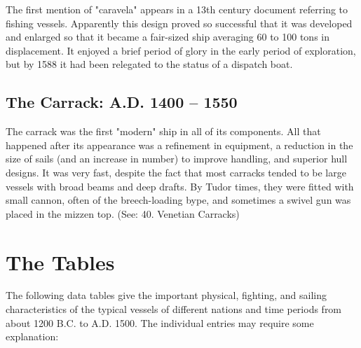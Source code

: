 \documentclass{article}
\begin{document}
\begin{multicols}{3}
The first mention of "caravela" appears in a 13th century document
referring to fishing vessels.  Apparently this design proved so
successful that it was developed and enlarged so that it became a
fair-sized ship averaging 60 to 100 tons in displacement.  It enjoyed
a brief period of glory in the early period of exploration, but by
1588 it had been relegated to the status of a dispatch boat.

\subsection{The Carrack:  A.D. 1400 -- 1550}

The carrack was the first "modern" ship in all of its components. All
that happened after its appearance was a refinement in equipment, a
reduction in the size of sails (and an increase in number) to improve
handling, and superior hull designs.  It was very fast, despite the
fact that most carracks tended to be large vessels with broad beams
and deep drafts.  By Tudor times, they were fitted with small cannon,
often of the breech-loading bype, and sometimes a swivel gun was
placed in the mizzen top.  (See: 40.  Venetian Carracks)

\end{multicols}

\section{The Tables}

The following data tables give the important physical, fighting, and
sailing characteristics of the typical vessels of different nations
and time periods from about 1200 B.C. to A.D. 1500.  The individual
entries may require some explanation:
\end{document}

